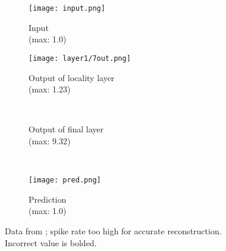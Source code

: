 \begin{figure}[h]
	\centering
	\graphicspath{{resources/models/3neurEx/fullRun/cycle_dirty/}}
	\begin{subfigure}{.16\textwidth}
		\centering
		\texttt{[image: input.png]}
		\caption{Input\\(max: 1.0)}
	\end{subfigure}
	\begin{minipage}{.5\textwidth}
		\centering
		\begin{subfigure}{.8\textwidth}
			\centering
			\texttt{[image: layer1/7out.png]}
			\caption{Output of locality layer\\(max: 1.23)}
		\end{subfigure}\\
		\vfill
		\begin{subfigure}{.8\textwidth}
			\centering
			\caption{Output of final layer\\(max: 9.32)}
		\end{subfigure}
	\end{minipage}
	\begin{minipage}{.25\textwidth}
		\centering
		\vspace{-10pt}
		\hspace{-20pt}
		\\
		\vspace{2em}
		\begin{subfigure}{\textwidth}
			\centering
			\texttt{[image: pred.png]}
			\caption{Prediction\\(max: 1.0)}
		\end{subfigure}
	\end{minipage}
	\caption{Data from ; spike rate too high for 
	accurate reconstruction. Incorrect value is bolded.}
	\label{fig:cyclerun_dirty}
\end{figure}




